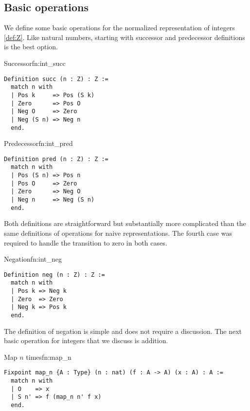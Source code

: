 \subsection{Basic operations}
We define some basic operations for the normalized representation of integers \ref{def:Z}. Like natural numbers, starting with successor and predecessor definitions is the best option.
\begin{func}{Successor}{fn:int_succ}
\begin{verbatim}
Definition succ (n : Z) : Z :=
  match n with
  | Pos k     => Pos (S k)
  | Zero      => Pos O
  | Neg O     => Zero
  | Neg (S n) => Neg n
  end.
\end{verbatim}
\end{func}
\begin{func}{Predecessor}{fn:int_pred}
\begin{verbatim}
Definition pred (n : Z) : Z :=
  match n with
  | Pos (S n) => Pos n
  | Pos O     => Zero
  | Zero      => Neg O
  | Neg n     => Neg (S n)
  end.
\end{verbatim}
\end{func}
Both definitions are straightforward but substantially more complicated than the same definitions of operations for naive representations. The fourth case was required to handle the transition to zero in both cases.
\begin{func}{Negation}{fn:int_neg}
\begin{verbatim}
Definition neg (n : Z) : Z :=
  match n with
  | Pos k => Neg k
  | Zero  => Zero
  | Neg k => Pos k
  end.
\end{verbatim}
\end{func}
The definition of negation is simple and does not require a discussion. The next basic operation for integers that we discuss is addition.
\begin{func}{Map $n$ times}{fn:map_n}
\begin{verbatim}
Fixpoint map_n {A : Type} (n : nat) (f : A -> A) (x : A) : A :=
  match n with
  | O    => x
  | S n' => f (map_n n' f x)
  end.
\end{verbatim}
\end{func}
  
